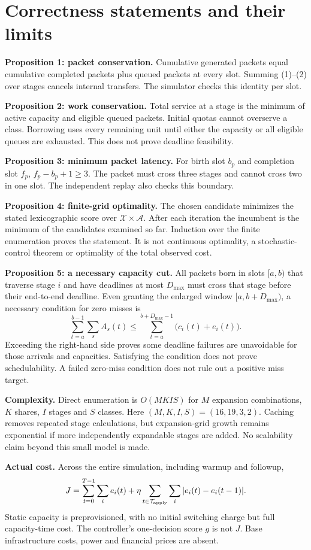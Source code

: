 \documentclass[10pt,a4paper]{article}
\newcommand{\page}[1]{\clearpage\section{#1}}
\begin{document}
\page{Correctness statements and their limits}
\textbf{Proposition 1: packet conservation.} Cumulative generated packets equal
cumulative completed packets plus queued packets at every slot. Summing (1)--(2)
over stages cancels internal transfers. The simulator checks this identity per slot.

\textbf{Proposition 2: work conservation.} Total service at a stage is the minimum
of active capacity and eligible queued packets. Initial quotas cannot overserve
a class. Borrowing uses every remaining unit until either the capacity or all
eligible queues are exhausted. This does not prove deadline feasibility.

\textbf{Proposition 3: minimum packet latency.} For birth slot $b_p$ and completion
slot $f_p$, $f_p-b_p+1\ge3$. The packet must cross three stages and cannot cross
two in one slot. The independent replay also checks this boundary.

\textbf{Proposition 4: finite-grid optimality.} The chosen candidate minimizes
the stated lexicographic score over $\mathcal X\times\mathcal A$. After each
iteration the incumbent is the minimum of the candidates examined so far.
Induction over the finite enumeration proves the statement. It is not continuous
optimality, a stochastic-control theorem or optimality of the total observed cost.

\textbf{Proposition 5: a necessary capacity cut.} All packets born in slots
$[a,b)$ that traverse stage $i$ and have deadlines at most $D_{\max}$ must cross
that stage before their end-to-end deadline. Even granting the enlarged window
$[a,b+D_{\max})$, a necessary condition for zero misses is
\[
\sum_{t=a}^{b-1}\sum_s A_s(t)\le
\sum_{t=a}^{b+D_{\max}-1}\bigl(c_i(t)+e_i(t)\bigr).
\]
Exceeding the right-hand side proves some deadline failures are unavoidable for
those arrivals and capacities. Satisfying the condition does not prove
schedulability. A failed zero-miss condition does not rule out a positive miss target.

\textbf{Complexity.} Direct enumeration is $O(MKIS)$ for $M$ expansion combinations,
$K$ shares, $I$ stages and $S$ classes. Here $(M,K,I,S)=(16,19,3,2)$.
Caching removes repeated stage calculations, but expansion-grid growth remains
exponential if more independently expandable stages are added. No scalability
claim beyond this small model is made.

\textbf{Actual cost.} Across the entire simulation, including warmup and followup,
\[
J=\sum_{t=0}^{T-1}\sum_i e_i(t)+\eta\sum_{t\in\mathcal T_{\rm apply}}
\sum_i|e_i(t)-e_i(t-1)|.
\]
Static capacity is preprovisioned, with no initial switching charge but full
capacity-time cost. The controller's one-decision score $g$ is not $J$. Base
infrastructure costs, power and financial prices are absent.
\end{document}
